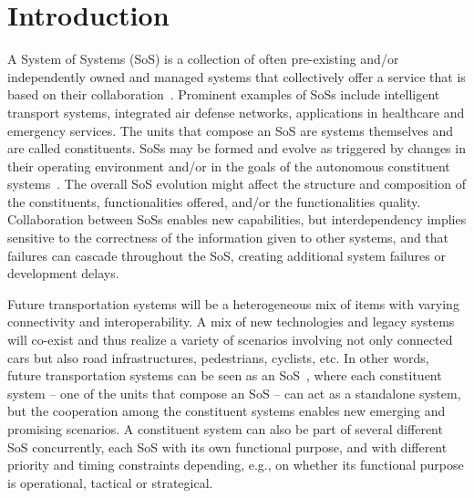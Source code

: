\section{Introduction} 

A System of Systems (SoS) is a collection of often pre-existing and/or independently owned and managed systems that collectively offer a service that is based on their collaboration~\cite{Fitzgerald2014,SoS}. Prominent examples of SoSs include intelligent transport systems, integrated air defense networks, applications in healthcare and emergency services. The units that compose an SoS are systems themselves and are called constituents. SoSs may be formed and evolve as triggered by changes in their operating environment and/or in the goals of the autonomous constituent systems~\cite{Fitzgerald2014,MeaningOfOf}. The overall SoS evolution might affect the structure and composition of the constituents, functionalities offered, and/or the functionalities quality. Collaboration between SoSs enables new capabilities, but interdependency implies sensitive to the correctness of the information given to other systems, and that failures can cascade throughout the SoS, creating additional system failures or development delays.


Future transportation systems will be a heterogeneous mix of items with varying connectivity and interoperability. A mix of new technologies and legacy systems will co-exist and thus realize a variety of scenarios involving not only connected cars but also road infrastructures, pedestrians, cyclists, etc. In other words, future transportation systems can be seen as an SoS~\cite{Fitzgerald2014,SoS,MeaningOfOf}, where each constituent system -- one of the units that compose an SoS -- can act as a standalone system, but the cooperation among the constituent systems enables new emerging and promising scenarios. A constituent system can also be part of several different SoS concurrently, each SoS with its own functional purpose, and with different priority and timing constraints depending, e.g., on whether its functional purpose is operational, tactical or strategical.

